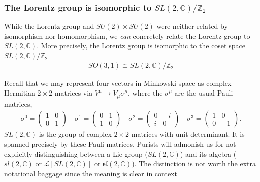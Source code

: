 \documentclass[12pt, oneside]{report}    %
\begin{document}
\subsubsection{\texorpdfstring{The Lorentz group is isomorphic to $SL(2,\mathbb{C})/\mathbb{Z}_2$}{The Lorentz group is isomorphic to SL(2,C)/Z2}}

While the Lorentz group and $SU(2)\times SU(2)$ were neither related by isomorphism nor homomorphism, we \textit{can} concretely relate the Lorentz group to $SL(2,\mathbb{C})$. More precisely, the Lorentz group is isomorphic to the coset space $SL(2,\mathbb{C})/\mathbb{Z}_2$
\begin{align}
    SO(3,1) \cong SL(2,\mathbb{C})/\mathbb{Z}_2
\end{align}

Recall that we may represent four-vectors in Minkowski space as complex Hermitian $2\times 2$ matrices via $V^\mu \rightarrow V_\mu\sigma^\mu$, where the $\sigma^\mu$ are the usual Pauli matrices,
\begin{align}
    \sigma^0 = 
    \begin{pmatrix}
        1 & 0\\
        0 & 1
    \end{pmatrix}
    \quad
    \sigma^1 = 
    \begin{pmatrix}
        0 & 1\\
        1 & 0
    \end{pmatrix}
    \quad
    \sigma^2 = 
    \begin{pmatrix}
        0 & -i\\
        i & 0
    \end{pmatrix}
    \quad
    \sigma^3 = 
    \begin{pmatrix}
        1 & 0\\
        0 & -1
    \end{pmatrix}.\label{eq:SUSYalg:pauli:matrices}
\end{align}
$SL(2,\mathbb C)$ is the group of complex $2\times 2$ matrices with unit determinant. It is spanned precisely by these Pauli matrices. 
Purists will admonish us for not explicitly distinguishing between a Lie group ($SL(2,\mathbb{C})$) and its algebra ($sl(2,\mathbb{C})$ or $\mathcal{L}[SL(2,\mathbb{C})]$ or $\mathfrak{sl}(2,\mathbb{C})$). The distinction is not worth the extra notational baggage since the meaning is clear in context
\end{document}
